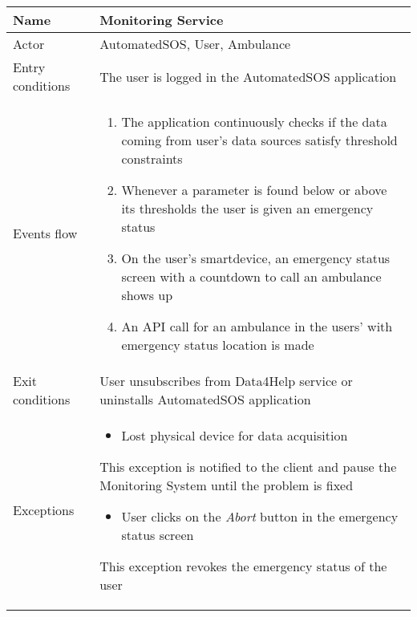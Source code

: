 \begin{table}[h!]
    \begin{tabular}{|l|p{12cm}|}
        \hline
        Name             & Monitoring Service \\ \hline
        Actor            & AutomatedSOS, User, Ambulance \\ \hline
        Entry conditions & The user is logged in the AutomatedSOS application\\ \hline
        Events flow      & 
        \begin{enumerate}
            \item The application continuously checks if the data coming from user's data sources satisfy threshold constraints
            \item Whenever a parameter is found below or above its thresholds the user is given an emergency status
            \item On the user's smartdevice, an emergency status screen with a countdown to call an ambulance shows up
            \item An API call for an ambulance in the users' with emergency status location is made
        \end{enumerate} \\ \hline
        Exit conditions  & User unsubscribes from Data4Help service or uninstalls AutomatedSOS application \\ \hline
        Exceptions       &  
        \begin{itemize}
            \item Lost physical device for data acquisition
        \end{itemize} 
        This exception is notified to the client and pause the Monitoring System until the problem is fixed
        \begin{itemize}
            \item User clicks on the \textit{Abort} button in the emergency status screen
        \end{itemize} This exception revokes the emergency status of the user \\ \hline
    \end{tabular}
\end{table}


